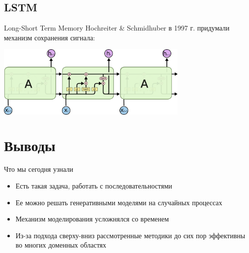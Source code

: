 \documentclass[14pt, fleqn, xcolor={dvipsnames, table}]{beamer}
\begin{document}
\subsection{LSTM}

\begin{frame}{Long-Short Term Memory}
Hochreiter \& Schmidhuber в 1997 г. придумали механизм сохранения сигнала:
\begin{center}
\includegraphics[width=0.7\textwidth]{LSTM3-chain.png}
\end{center}

\end{frame}

\section{Выводы}

\begin{frame}{Что мы сегодня узнали}
\begin{itemize}
  \item Есть такая задача, работать с последовательностями
  \item Ее можно решать генеративными моделями на случайных процессах
  \item Механизм моделирования усложнялся со временем
  \item Из-за подхода сверху-вниз рассмотренные методики до сих пор эффективны во многих доменных областях
\end{itemize}
\end{frame}
\end{document}
